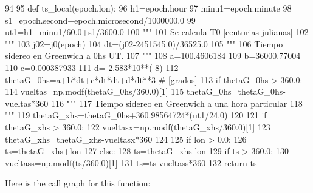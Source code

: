 \begin{DoxyCode}
94 
95 def ts_local(epoch,lon):
96     h1=epoch.hour
97     minu1=epoch.minute
98     s1=epoch.second+epoch.microsecond/1000000.0
99     ut1=h1+minu1/60.0+s1/3600.0
100     """
101     Se calcula T0 [centurias julianas]
102     """
103     j02=j0(epoch)
104     dt=(j02-2451545.0)/36525.0 
105     """
106     Tiempo sidereo en Greenwich a 0hs UT.
107     """
108     a=100.4606184
109     b=36000.77004
110     c=0.000387933
111     d=-2.583*10**(-8)   
112     thetaG_0hs=a+b*dt+c*dt*dt+d*dt**3 # [grados]
113     if thetaG_0hs > 360.0:
114        vueltas=np.modf(thetaG_0hs/360.0)[1]
115        thetaG_0hs=thetaG_0hs-vueltas*360
116     """
117     Tiempo sidereo en Greenwich a una hora particular
118     """
119     thetaG_xhs=thetaG_0hs+360.98564724*(ut1/24.0)
120 
121     if thetaG_xhs > 360.0:
122         vueltasx=np.modf(thetaG_xhs/360.0)[1]
123         thetaG_xhs=thetaG_xhs-vueltasx*360
124     
125     if lon > 0.0:
126         ts=thetaG_xhs+lon
127     else:
128         ts=thetaG_xhs-lon
129     if ts > 360.0:
130         vueltass=np.modf(ts/360.0)[1]
131         ts=ts-vueltass*360
132     return ts  
    \end{DoxyCode}


\-Here is the call graph for this function\-:


